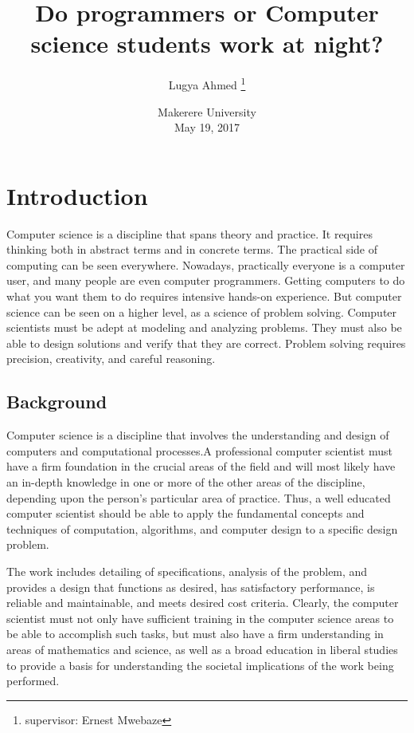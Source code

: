 \documentclass[options]{article}
\title{Do programmers or Computer science students work at night?}
\author{Lugya Ahmed \thanks{supervisor: Ernest Mwebaze}}
\date{%
    Makerere University\\%
    May 19, 2017
}
\begin{document}
\begin{titlepage}
\maketitle
\end{titlepage}





\section{\textbf{ Introduction}} 
Computer science is a discipline that spans theory and practice. It requires thinking both in abstract terms and in concrete terms. The practical side of computing can be seen everywhere. Nowadays, practically everyone is a computer user, and many people are even computer programmers. Getting computers to do what you want them to do requires intensive hands-on experience. But computer science can be seen on a higher level, as a science of problem solving. Computer scientists must be adept at modeling and analyzing problems. They must also be able to design solutions and verify that they are correct. Problem solving requires precision, creativity, and careful reasoning. 


\subsection{\textbf{Background}}
Computer science is a discipline that involves the understanding and design of computers and computational processes.A professional computer scientist must have a firm foundation in the crucial areas of the field and will most likely have an in-depth knowledge in one or more of the other areas of the discipline, depending upon the person's particular area of practice. Thus, a well educated computer scientist should be able to apply the fundamental concepts and techniques of computation, algorithms, and computer design to a specific design problem.  \bigbreak

The work includes detailing of specifications, analysis of the problem, and provides a design that functions as desired, has satisfactory performance, is reliable and maintainable, and meets desired cost criteria. Clearly, the computer scientist must not only have sufficient training in the computer science areas to be able to accomplish such tasks, but must also have a firm understanding in areas of mathematics and science, as well as a broad education in liberal studies to provide a basis for understanding the societal implications of the work being performed. \bigbreak
\end{document}
